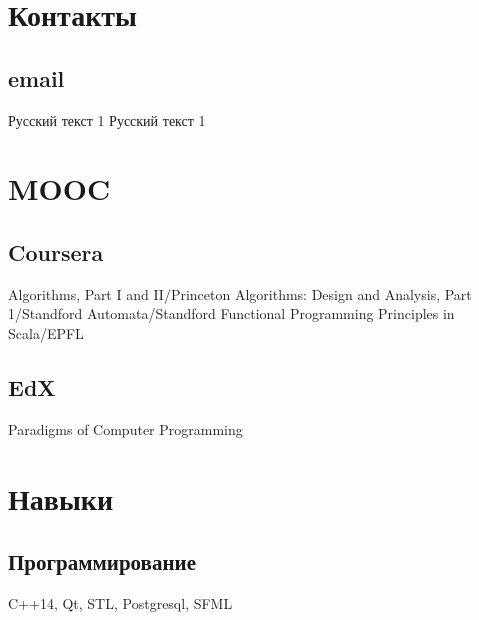 \documentclass[a4paper]{curricula-vitae}
\begin{document}




\begin{minipage}[t]{0.33\textwidth} %

\section{Контакты} 
\subsection{email}
Русский текст 1
Русский текст 1

\section{MOOC}
\subsection{Coursera}
Algorithms, Part I and II/Princeton
Algorithms: Design and Analysis, Part 1/Standford
Automata/Standford
Functional Programming Principles in Scala/EPFL

\subsection{EdX}
Paradigms of Computer Programming

\section{Навыки}

\subsection{Программирование}
C++14, Qt, STL,
Postgresql, SFML


\end{minipage}
\end{document}
